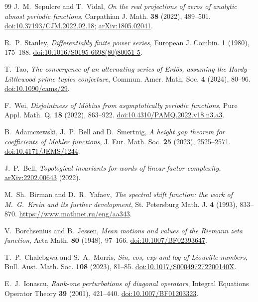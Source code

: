 \documentclass[11pt]{article}
\theoremstyle{definition}
\theoremstyle{remark}
\begin{document}
\begin{thebibliography}{99}
J.~M.~Sepulcre and T.~Vidal,
\emph{On the real projections of zeros of analytic almost periodic functions},
Carpathian J. Math. \textbf{38} (2022), 489--501.
\href{https://doi.org/10.37193/CJM.2022.02.18}{doi:10.37193/CJM.2022.02.18};
\href{https://arxiv.org/abs/1805.02041}{arXiv:1805.02041}.

R.~P.~Stanley,
\emph{Differentiably finite power series},
European J. Combin. \textbf{1} (1980), 175--188.
\href{https://doi.org/10.1016/S0195-6698(80)80051-5}{doi:10.1016/S0195-6698(80)80051-5}.

T.~Tao,
\emph{The convergence of an alternating series of Erd\H{o}s, assuming the
Hardy--Littlewood prime tuples conjecture},
Commun. Amer. Math. Soc. \textbf{4} (2024), 80--96.
\href{https://doi.org/10.1090/cams/29}{doi:10.1090/cams/29}.

F.~Wei,
\emph{Disjointness of M\"obius from asymptotically periodic functions},
Pure Appl. Math. Q. \textbf{18} (2022), 863--922.
\href{https://doi.org/10.4310/PAMQ.2022.v18.n3.a3}{doi:10.4310/PAMQ.2022.v18.n3.a3}.

B.~Adamczewski, J.~P.~Bell and D.~Smertnig,
\emph{A height gap theorem for coefficients of Mahler functions},
J. Eur. Math. Soc. \textbf{25} (2023), 2525--2571.
\href{https://doi.org/10.4171/JEMS/1244}{doi:10.4171/JEMS/1244}.

J.~P.~Bell,
\emph{Topological invariants for words of linear factor complexity},
\href{https://arxiv.org/abs/2202.00643}{arXiv:2202.00643} (2022).

M.~Sh.~Birman and D.~R.~Yafaev,
\emph{The spectral shift function: the work of M.~G.~Krein and its further development},
St. Petersburg Math. J. \textbf{4} (1993), 833--870.
\url{https://www.mathnet.ru/eng/aa343}.

V.~Borchsenius and B.~Jessen,
\emph{Mean motions and values of the Riemann zeta function},
Acta Math. \textbf{80} (1948), 97--166.
\href{https://doi.org/10.1007/BF02393647}{doi:10.1007/BF02393647}.

T.~P.~Chalebgwa and S.~A.~Morris,
\emph{Sin, cos, exp and log of Liouville numbers},
Bull. Aust. Math. Soc. \textbf{108} (2023), 81--85.
\href{https://doi.org/10.1017/S000497272200140X}
{doi:10.1017/S000497272200140X}.

E.~J.~Ionascu,
\emph{Rank-one perturbations of diagonal operators},
Integral Equations Operator Theory \textbf{39} (2001), 421--440.
\href{https://doi.org/10.1007/BF01203323}{doi:10.1007/BF01203323}.


\end{thebibliography}
\end{document}
